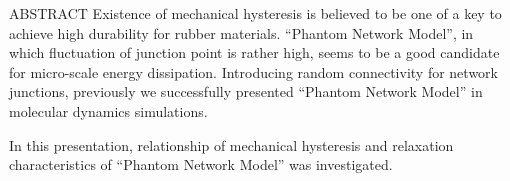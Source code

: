 \begin{itembox}[l]{ABSTRACT}
	Existence of mechanical hysteresis is believed to be one of a key to achieve high durability for rubber materials.
	``Phantom Network Model'', in which fluctuation of junction point is rather high, seems to be a good candidate for micro-scale energy dissipation.
	Introducing random connectivity for network junctions, previously we successfully presented ``Phantom Network Model'' in molecular dynamics simulations.

	In this presentation, relationship of mechanical hysteresis and relaxation characteristics of ``Phantom Network Model'' was investigated.
\end{itembox}